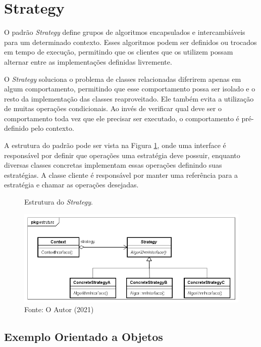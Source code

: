 \section{Strategy}


O padrão \textit{Strategy} define grupos de algoritmos encapsulados e
intercambiáveis para um determinado contexto. Esses 
algoritmos podem ser definidos ou trocados em tempo de 
execução, permitindo que os clientes que os utilizem possam
alternar entre as implementações definidas livremente.
\cite{gamma:1995}

O \textit{Strategy} soluciona o problema de classes relacionadas 
diferirem apenas em algum comportamento, permitindo que 
esse comportamento possa ser isolado e o resto da implementação 
das classes reaproveitado. Ele também evita a utilização de 
muitas operações condicionais. Ao invés de verificar qual 
deve ser o comportamento toda vez que ele precisar ser 
executado, o comportamento é pré-definido pelo contexto. 

A estrutura do padrão pode ser vista na Figura \ref{strategy_struct}, 
onde uma interface é responsável por definir que operações 
uma estratégia deve possuir, enquanto diversas classes 
concretas implementam essas operações definindo suas 
estratégias. A classe cliente é responsável por manter 
uma referência para a estratégia e chamar as 
operações desejadas.

\begin{figure}[htb]
	\caption{\label{strategy_struct}Estrutura do \textit{Strategy}.}
	\begin{center}
	    \includegraphics[scale=0.5]{5_padroes-contexto-funcional/5.3_comportamentais/5.3.09_strategy/strategy_estrutura.png}
	\end{center}
  \caption*{Fonte: O Autor (2021)}
\end{figure}

\subsection*{Exemplo Orientado a Objetos}


